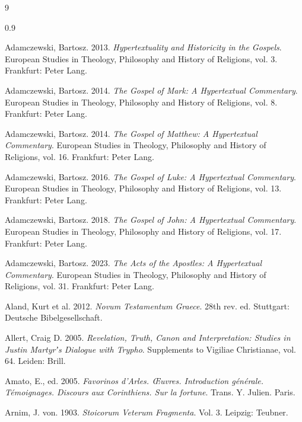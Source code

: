 %
%
\clearpage

\begin{thebibliography}{9}
\begin{spacing}{0.9}
\begin{small}

Adamczewski, Bartosz. 2013. %
\textit{Hypertextuality and Historicity in the Gospels}. %
European Studies in Theology, Philosophy and History of Religions, vol. 3. %
Frankfurt: Peter Lang. %

Adamczewski, Bartosz. 2014. %
\textit{The Gospel of Mark: A Hypertextual Commentary}. %
European Studies in Theology, Philosophy and History of Religions, vol. 8. %
Frankfurt: Peter Lang. %

Adamczewski, Bartosz. 2014. %
\textit{The Gospel of Matthew: A Hypertextual Commentary}. %
European Studies in Theology, Philosophy and History of Religions, vol. 16. %
Frankfurt: Peter Lang. %

Adamczewski, Bartosz. 2016. %
\textit{The Gospel of Luke: A Hypertextual Commentary}. %
European Studies in Theology, Philosophy and History of Religions, vol. 13. %
Frankfurt: Peter Lang. %

Adamczewski, Bartosz. 2018. %
\textit{The Gospel of John: A Hypertextual Commentary}. %
European Studies in Theology, Philosophy and History of Religions, vol. 17. %
Frankfurt: Peter Lang. %

Adamczewski, Bartosz. 2023. %
\textit{The Acts of the Apostles: A Hypertextual Commentary}. %
European Studies in Theology, Philosophy and History of Religions, vol. 31. %
Frankfurt: Peter Lang. %

Aland, Kurt et al. 2012. \textit{Novum Testamentum Graece}. %
28th rev. ed. %
Stuttgart: Deutsche Bibelgesellschaft. %

Allert, Craig D. 2005. %
\textit{Revelation, Truth, Canon and Interpretation: %
Studies in Justin Martyrʼs Dialogue with Trypho}. %
Supplements to Vigiliae Christianae, vol. 64. %
Leiden: Brill. %

Amato, E., ed. 2005. %
\textit{Favorinos d’Arles. Œuvres. Introduction générale.
Témoignages. Discours aux Corinthiens. Sur la fortune}. %
Trans. Y. Julien. %
Paris. %

Arnim, J. von. 1903. %
\textit{Stoicorum Veterum Fragmenta}. Vol. 3. %
Leipzig: Teubner. %


\end{small}
\end{spacing}
\end{thebibliography}
